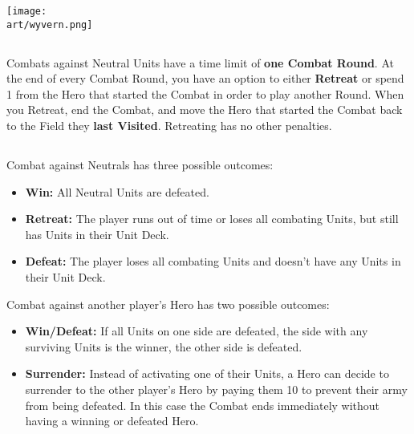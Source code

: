 \begin{multicols*}{2}
\begin{center}
  \texttt{[image: \\art/wyvern.png]}
\end{center}

\subsection*{}
Combats against Neutral Units have a time limit of \textbf{one Combat Round}.
At the end of every Combat Round, you have an option to either \textbf{Retreat} or spend 1  from the Hero that started the Combat in order to play another Round.
When you Retreat, end the Combat, and move the Hero that started the Combat back to the Field they \textbf{last Visited}.
Retreating has no other penalties.


\vspace*{-1em}
\subsection*{}

Combat against Neutrals has three possible outcomes:
\begin{itemize}
  \item \textbf{Win:} All Neutral Units are defeated.
  \item \textbf{Retreat:} The player runs out of time or loses all combating Units, but still has Units in their Unit Deck.
  \item \textbf{Defeat:} The player loses all combating Units and doesn't have any Units in their Unit Deck.
\end{itemize}

Combat against another player's Hero has two possible outcomes:
\begin{itemize}
 \item \textbf{Win/Defeat:} If all Units on one side are defeated, the side with any surviving Units is the winner, the other side is defeated.
 \item \textbf{Surrender:} Instead of activating one of their Units, a Hero can decide to surrender to the other player's Hero by paying them 10  to prevent their army from being defeated. In this case the Combat ends immediately without having a winning or defeated Hero.
\end{itemize}
\vspace{0.5em}
\par


\end{multicols*}
